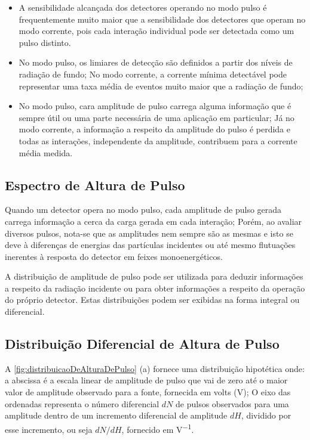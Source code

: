 \documentclass[11pt,a4paper]{article}
\begin{document}
			\begin{itemize}
				\item A sensibilidade alcançada dos detectores operando no modo pulso é frequentemente muito maior que a sensibilidade dos detectores que operam no modo corrente, pois cada interação individual pode ser detectada como um pulso distinto.
				\item No modo pulso, os limiares de detecção são definidos a partir dos níveis de radiação de fundo; No modo corrente, a corrente mínima detectável pode representar uma taxa média de eventos muito maior que a radiação de fundo;
				\item No modo pulso, cara amplitude de pulso carrega alguma informação que é sempre útil ou uma parte necessária de uma aplicação em particular; Já no modo corrente, a informação a respeito da amplitude do pulso é perdida e todas as interações, independente da amplitude, contribuem para a corrente média medida. 
			\end{itemize}

	\subsection{Espectro de Altura de Pulso}

		Quando um detector opera no modo pulso, cada amplitude de pulso gerada carrega informação a cerca da carga gerada em cada interação; Porém, ao avaliar diversos pulsos, nota-se que as amplitudes nem sempre são as mesmas e isto se deve à diferenças de energias das partículas incidentes ou até mesmo flutuações inerentes à resposta do detector em feixes monoenergéticos. 

		A distribuição de amplitude de pulso pode ser utilizada para deduzir informações a respeito da radiação incidente ou para obter informações a respeito da operação do próprio detector. Estas distribuições podem ser exibidas na forma integral ou diferencial.



		\subsection{Distribuição Diferencial de Altura de Pulso}

			A  \ref{fig:distribuicaoDeAlturaDePulso} (a) fornece uma distribuição hipotética onde: a abscissa é a escala linear de amplitude de pulso que vai de zero até o maior valor de amplitude observado para a fonte, fornecida em volts (V); O eixo das ordenadas representa o número diferencial $dN$  de pulsos observados para uma amplitude dentro de um incremento diferencial de amplitude $dH$, dividido por esse incremento, ou seja $dN/dH$, fornecido em \unit{V^{-1}}.
\end{document}
